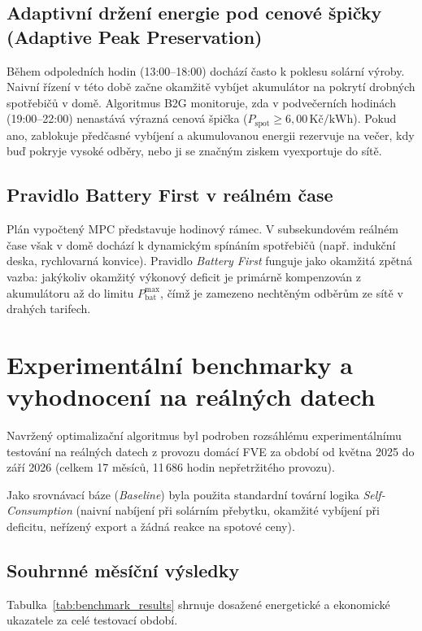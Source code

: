 \documentclass[FM,BP]{tulthesis}
\begin{document}
	\subsection{Adaptivní držení energie pod cenové špičky (Adaptive Peak Preservation)}
	Během odpoledních hodin (13:00--18:00) dochází často k poklesu solární výroby. Naivní řízení v této době začne okamžitě vybíjet akumulátor na pokrytí drobných spotřebičů v domě. Algoritmus B2G monitoruje, zda v podvečerních hodinách (19:00--22:00) nenastává výrazná cenová špička ($P_{\text{spot}} \ge 6{,}00\,\text{Kč/kWh}$). Pokud ano, zablokuje předčasné vybíjení a akumulovanou energii rezervuje na večer, kdy buď pokryje vysoké odběry, nebo ji se značným ziskem vyexportuje do sítě.

	\subsection{Pravidlo Battery First v reálném čase}
	Plán vypočtený MPC představuje hodinový rámec. V subsekundovém reálném čase však v domě dochází k dynamickým spínáním spotřebičů (např. indukční deska, rychlovarná konvice). Pravidlo \textit{Battery First} funguje jako okamžitá zpětná vazba: jakýkoliv okamžitý výkonový deficit je primárně kompenzován z akumulátoru až do limitu $P_{\text{bat}}^{\max}$, čímž je zamezeno nechtěným odběrům ze sítě v drahých tarifech.

	\section{Experimentální benchmarky a vyhodnocení na reálných datech}
	\label{sec:benchmarky}

	Navržený optimalizační algoritmus byl podroben rozsáhlému experimentálnímu testování na reálných datech z provozu domácí FVE za období od května 2025 do září 2026 (celkem 17 měsíců, 11\,686 hodin nepřetržitého provozu). 

	Jako srovnávací báze (\textit{Baseline}) byla použita standardní tovární logika \textit{Self-Consumption} (naivní nabíjení při solárním přebytku, okamžité vybíjení při deficitu, neřízený export a žádná reakce na spotové ceny).

	\subsection{Souhrnné měsíční výsledky}
	Tabulka~\ref{tab:benchmark_results} shrnuje dosažené energetické a ekonomické ukazatele za celé testovací období.
\end{document}
